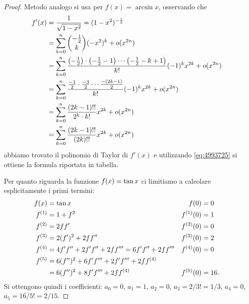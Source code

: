 \begin{proof}
Metodo analogo si usa per $f(x)=\arcsin x$, osservando che
\begin{align*}
  f'(x) &= \frac{1}{\sqrt{1-x^2}}
  = (1-x^2)^{-\frac 1 2} \\
  &= \sum_{k=0}^n {-\frac 1 2 \choose k} (-x^2)^k + o(x^{2n}) \\
  &= \sum_{k=0}^n \frac{{\left( -\frac 1 2 \right)}\cdot {\left( -\frac 1 2 - 1 \right)}\cdots {\left( -\frac 1 2 - k+1 \right)}}{k!}(-1)^k x^{2k} + o(x^{2n}) \\
  &= \sum_{k=0}^n \frac{\frac{-1}{2} \cdot \frac{-3}{2}\cdots \frac{-(2k-1)}{2}}{k!}(-1)^k x^{2k} + o(x^{2n}) \\
  &= \sum_{k=0}^n \frac{(2k-1)!!}{2^k \cdot k!}x^{2k} + o(x^{2n}) \\
  &= \sum_{k=0}^n \frac{(2k-1)!!}{(2k)!!}x^{2k} + o(x^{2n})
 \end{align*}
abbiamo trovato il polinomio di Taylor di $f'(x)$ e utilizzando \eqref{eq:4993725}
si ottiene la formula riportata in tabella.

Per quanto riguarda la funzione $f(x) = \operatorname{tan} x$ ci limitiamo a calcolare esplicitamente i primi termini:
\begin{align*}
  f(x) &= \operatorname{tan} x
  & f(0)&=0\\
  f^{(1)} &= 1+ f^2
  & f^{(1)}(0) &= 1\\
  f^{(2)} &= 2ff'
  & f^{(2)}(0) &= 0 \\
  f^{(3)} &= 2(f')^2 + 2f f''
  & f^{(3)}(0) &= 2 \\
  f^{(4)} &= 4 f' f'' + 2 f' f'' + 2 f f''' = 6 f' f'' + 2 f f'''
   & f^{(4)}(0) &= 0 \\
   f^{(5)} &= 6 (f'')^2 + 6 f' f''' + 2 f' f''' + 2 f f^{(4)}&&\\
           &= 6 (f'')^2 + 8 f' f''' + 2 f f^{(4)}
    & f^{(5)}(0) &= 16.
\end{align*}
Si ottengono quindi i coefficienti:
 $a_0 = 0$, $a_1 = 1$, $a_2 = 0$, $a_3 = 2/3! = 1/3$, $a_4=0$, $a_5 = 16/ 5! = 2/15$.
\end{proof}

